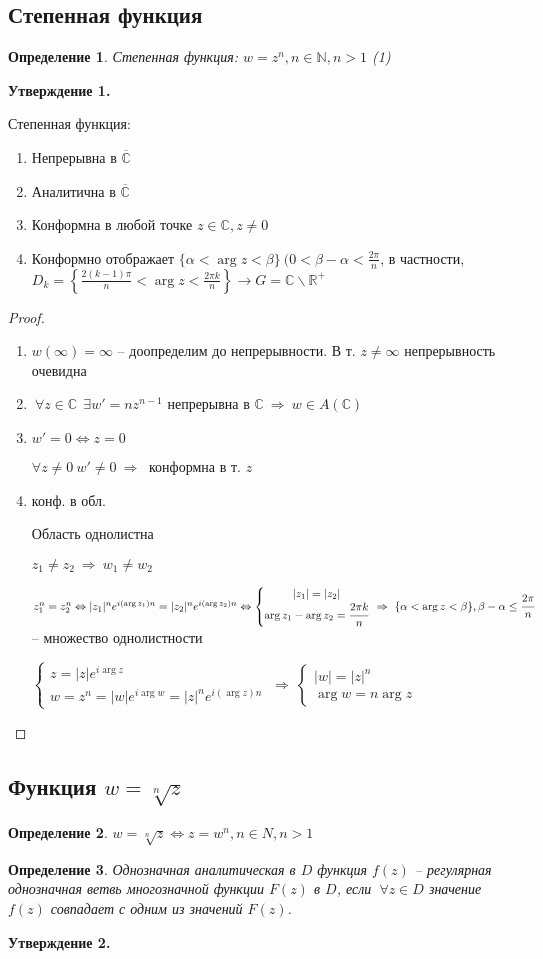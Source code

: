\documentclass[final]{report}
\newcommand{\forcenewline}{$\phantom{\mbox{newline}}$\newline}
\newcommand{\then}{\ \Rightarrow\ }
\newcommand{\R}{\mathbb{R}}
\renewcommand{\C}{\mathbb{C}}
\newcommand{\N}{\mathbb{N}}
\newcommand{\LRA}{\Leftrightarrow}
\renewcommand{\bar}{\overline}
\renewcommand{\a}{\alpha}
\renewcommand{\b}{\beta}
\newcommand{\E}{\ \exists}
\newcommand{\F}{\ \forall}
\newcommand{\CC}{\bar{\C}}
\newcommand{\sys}[1]{\left\{\begin{matrix}#1\end{matrix}\right.}
\newcommand{\opr}[1]{\begin{opred}#1\end{opred}}
\newtheorem*{opred}{Определение}
\theoremstyle{remark}
\begin{document}
\subsection{Степенная функция}

\opr{Степенная функция: $w=z^n, n\in \N, n>1$ (1)}
{\bfseries Утверждение 1.}

Степенная функция:
\begin{enumerate}
\item Непрерывна в $\CC$
\item Аналитична в $\CC$
\item Конформна в любой точке $z\in\C,z\neq0$
\item Конформно отображает $\{\a<\arg z<\b\}\ (0<\b-\a<\frac{2\pi}{n}$, в частности, $D_k=\left\{\frac{2(k-1)\pi}{n}<\arg z<\frac{2\pi k}{n}\right\}\to G=\C\smallsetminus\R^+$
\end{enumerate}
\begin{proof}
\forcenewline
\begin{enumerate}
\item $w(\infty)=\infty$ -- доопределим до непрерывности. В т. $z\neq\infty$ непрерывность очевидна
\item $\F z\in\C\ \E w'=nz^{n-1}$ непрерывна в $\C\then w\in A(\C)$
\item $w'=0\LRA z=0$

$\forall z\neq0\ w'\neq0\then$ конформна в т. $z$
\item конф. в обл.

Область однолистна

$z_1\neq z_2\then w_1\neq w_2$

$z_1^n=z_2^n\LRA |z_1|^ne^{i(\arg z_1)n}=|z_2|^ne^{i(\arg z_2)n}\LRA\sys{|z_1|=|z_2| \\ \arg z_1-\arg z_2=\cfrac{2\pi k}{n}}\then \{\a<\arg z<\b\}, \b-\a\leq \cfrac{2\pi}{n}$ -- множество однолистности

$\sys{z=|z|e^{i\arg z}\\w=z^n=|w|e^{i\arg w}=|z|^ne^{i(\arg z)n}}\then\sys{|w|=|z|^n \\ \arg w=n\arg z}$
\end{enumerate}
\end{proof}

\subsection{Функция $w=\sqrt[n]{z}$}

\opr{$w=\sqrt[n]{z}\LRA z=w^n,n\in N, n>1$}
\opr{Однозначная аналитическая в $D$ функция $f(z)$ -- регулярная однозначная ветвь многозначной функции $F(z)$ в $D$, если $\F z\in D$ значение $f(z)$ совпадает с одним из значений $F(z)$.}
{\bfseries Утверждение 2.}
\end{document}
